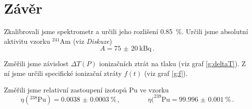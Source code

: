 \section*{Závěr}
Zkalibrovali jsme spektrometr a určili jeho rozlišení \SI{0.85}{\percent}.
Určili jsme absolutní aktivitu vzorku $^{241}$Am (viz \emph{Diskuze})
\begin{equation*}
A=\SI{75(20)}{\kilo\becquerel} \,.
\end{equation*}

Změřili jsme závislost $\Delta T(P)$ ionizačních ztrát na tlaku (viz graf \ref{g:deltaT}). Z ní jsme určili specifické ionizační ztráty $f(t)$ (viz graf \ref{g:f}).



Změřili jsme relativní zastoupení izotopů Pu ve vzorku
\begin{equation*}
\eta(^{238}\text{Pu}) = \SI{0.0038(3)}{\percent}
 \,, \qquad \qquad \eta(^{239}\text{Pu} = \SI{99.996(1)}{\percent} \,.
\end{equation*}
